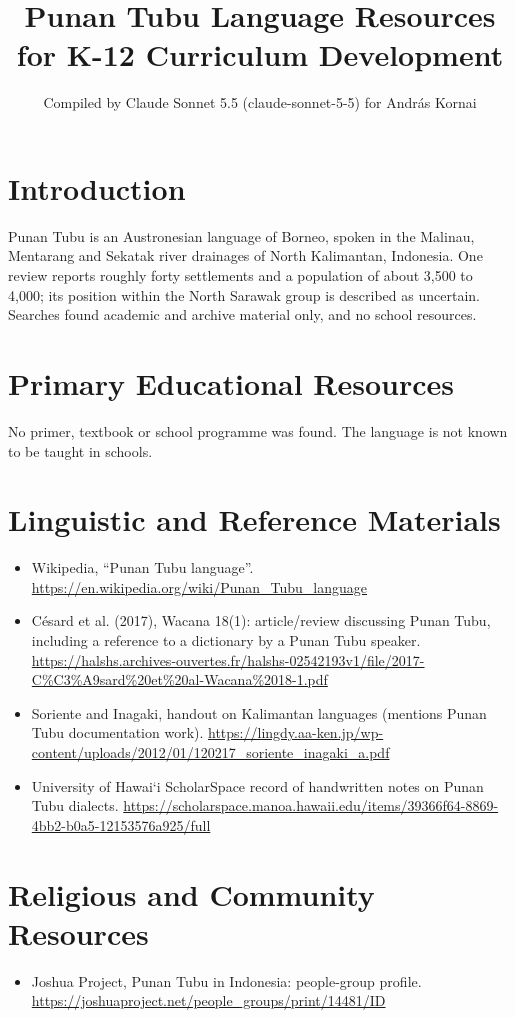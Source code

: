 \documentclass[12pt]{article}
\title{Punan Tubu Language Resources for K-12 Curriculum Development}
\author{Compiled by Claude Sonnet 5.5 (claude-sonnet-5-5) for Andr\'as Kornai}
\date{}
\begin{document}
\maketitle

\section{Introduction}
Punan Tubu is an Austronesian language of Borneo, spoken in the Malinau, Mentarang and Sekatak river drainages of North Kalimantan, Indonesia. One review reports roughly forty settlements and a population of about 3,500 to 4,000; its position within the North Sarawak group is described as uncertain. Searches found academic and archive material only, and no school resources.

\section{Primary Educational Resources}
No primer, textbook or school programme was found. The language is not known to be taught in schools.

\section{Linguistic and Reference Materials}
\begin{itemize}
\item Wikipedia, ``Punan Tubu language''. \url{https://en.wikipedia.org/wiki/Punan_Tubu_language}
\item C\'esard et al. (2017), Wacana 18(1): article/review discussing Punan Tubu, including a reference to a dictionary by a Punan Tubu speaker. \url{https://halshs.archives-ouvertes.fr/halshs-02542193v1/file/2017-C%C3%A9sard%20et%20al-Wacana%2018-1.pdf}
\item Soriente and Inagaki, handout on Kalimantan languages (mentions Punan Tubu documentation work). \url{https://lingdy.aa-ken.jp/wp-content/uploads/2012/01/120217_soriente_inagaki_a.pdf}
\item University of Hawai\textquoteleft i ScholarSpace record of handwritten notes on Punan Tubu dialects. \url{https://scholarspace.manoa.hawaii.edu/items/39366f64-8869-4bb2-b0a5-12153576a925/full}
\end{itemize}

\section{Religious and Community Resources}
\begin{itemize}
\item Joshua Project, Punan Tubu in Indonesia: people-group profile. \url{https://joshuaproject.net/people_groups/print/14481/ID}
\end{itemize}
\end{document}

